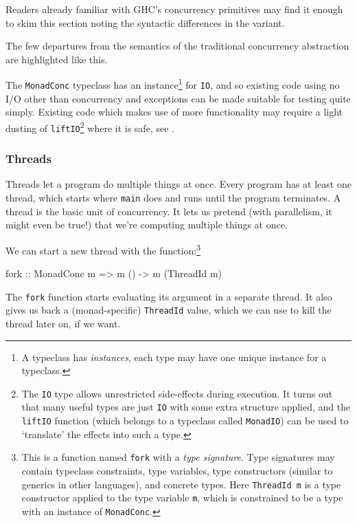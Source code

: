 Readers already familiar with GHC's concurrency primitives may find it
enough to skim this section noting the syntactic differences in the
\dejafu{} variant.

\begin{departure}
  The few departures from the semantics of the traditional concurrency
  abstraction are highlighted like this.
\end{departure}

The \verb|MonadConc| typeclass has an instance\footnote{A typeclass
  has \emph{instances}, each type may have one unique instance for a
  typeclass.} for \verb|IO|, and so existing code using no I/O other
than concurrency and exceptions can be made suitable for testing quite
simply. Existing code which makes use of more functionality may
require a light dusting of \verb|liftIO|\footnote{The \texttt{IO} type
  allows unrestricted side-effects during execution. It turns out that
  many useful types are just \texttt{IO} with some extra structure
  applied, and the \texttt{liftIO} function (which belongs to a
  typeclass called \texttt{MonadIO}) can be used to `translate' the
  effects into such a type.} where it is safe, see
.

\subsubsection{Threads}
\label{sec:abstraction-typeclass-threads}

Threads let a program do multiple things at once. Every program has at
least one thread, which starts where \verb|main| does and runs until
the program terminates. A thread is the basic unit of concurrency. It
lets us pretend (with parallelism, it might even be true!) that we're
computing multiple things at once.

We can start a new thread with the function:\footnote{This is a
  function named \texttt{fork} with a \emph{type signature}. Type
  signatures may contain typeclass constraints, type variables, type
  constructors (similar to generics in other languages), and concrete
  types. Here \texttt{ThreadId m} is a type constructor applied to the
  type variable \texttt{m}, which is constrained to be a type with an
  instance of \texttt{MonadConc}.}

\begin{haskellcode}
fork :: MonadConc m => m () -> m (ThreadId m)
\end{haskellcode}

The \verb|fork| function starts evaluating its argument in a separate
thread. It also gives us back a (monad-specific) \verb|ThreadId|
value, which we can use to kill the thread later on, if we want.

